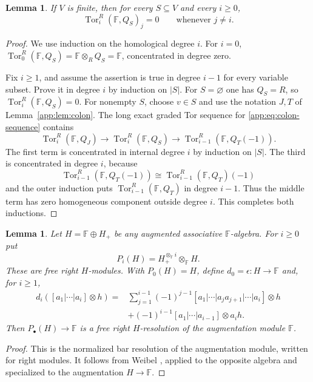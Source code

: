 \documentclass[11pt]{article}
\numberwithin{equation}{section}
\newtheorem{lemma}[theorem]{Lemma}
\theoremstyle{definition}
\theoremstyle{remark}
\newcommand{\Tor}{\operatorname{Tor}}
\begin{document}
\begin{lemma}\label{app:lem:finite}
If $V$ is finite, then for every $S\subseteq V$ and every $i\ge0$,
\[
\Tor_i^R(\mathbb F,Q_S)_j=0\qquad\text{whenever }j\ne i.
\tag{2}\label{app:eq:finite-linearity}
\]
\end{lemma}
\begin{proof}
We use induction on the homological degree $i$.  For $i=0$,
$\Tor_0^R(\mathbb F,Q_S)=\mathbb F\otimes_RQ_S=\mathbb F$, concentrated in degree zero.

Fix $i\ge1$, and assume the assertion is true in degree $i-1$ for every variable subset.  Prove it in degree $i$ by induction on $|S|$.  For $S=\varnothing$ one has $Q_S=R$, so $\Tor_i^R(\mathbb F,Q_S)=0$.  For nonempty $S$, choose $v\in S$ and use the notation $J,T$ of Lemma~\ref{app:lem:colon}.  The long exact graded Tor sequence for \eqref{app:eq:colon-sequence} contains
\[
\Tor_i^R(\mathbb F,Q_J)\longrightarrow
\Tor_i^R(\mathbb F,Q_S)\longrightarrow
\Tor_{i-1}^R(\mathbb F,Q_T(-1)).
\]
The first term is concentrated in internal degree $i$ by induction on $|S|$.  The third is concentrated in degree $i$, because
\[
\Tor_{i-1}^R(\mathbb F,Q_T(-1))
\cong\Tor_{i-1}^R(\mathbb F,Q_T)(-1)
\]
and the outer induction puts $\Tor_{i-1}^R(\mathbb F,Q_T)$ in degree $i-1$.  Thus the middle term has zero homogeneous component outside degree $i$.  This completes both inductions.
\end{proof}

\begin{lemma}\label{app:lem:bar}
Let $H=\mathbb F\oplus H_+$ be any augmented associative $\mathbb F$-algebra.  For $i\ge0$ put
\[
P_i(H)=H_+^{\otimes_\mathbb F i}\otimes_\mathbb F H.
\]
These are free right $H$-modules.  With $P_0(H)=H$, define $d_0=\epsilon:H\to\mathbb F$ and, for $i\ge1$,
\begin{align*}
d_i([a_1|\cdots|a_i]\otimes h)
={}&\sum_{j=1}^{i-1}(-1)^{j-1}
[a_1|\cdots|a_ja_{j+1}|\cdots|a_i]\otimes h\\
&+(-1)^{i-1}[a_1|\cdots|a_{i-1}]\otimes a_ih.
\end{align*}
Then $P_\bullet(H)\to\mathbb F$ is a free right $H$-resolution of the augmentation module $\mathbb F$.
\end{lemma}
\begin{proof}
This is the normalized bar resolution of the augmentation module,
written for right modules.  It follows from Weibel
\cite[Section~8.6.12 and Exercise~8.6.4]{Weibel},
applied to the opposite algebra and specialized to the augmentation
$H\to\mathbb F$.
\end{proof}
\end{document}
